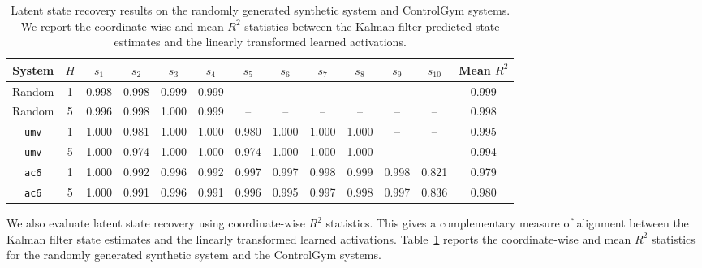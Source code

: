\documentclass[11pt]{article}
\newcommand{\<}{\langle}
\renewcommand{\>}{\rangle}
\numberwithin{equation}{section}
\begin{document}
\begin{table}[ht]
  \caption{Latent state recovery results on the randomly generated synthetic system and ControlGym systems. We report the coordinate-wise and mean \(R^2\) statistics between the Kalman filter predicted state estimates and the linearly transformed learned activations.}
  \label{table:latent-recovery-r2}
  \begin{center}
    \begin{small}
    \setlength{\tabcolsep}{4pt}
      \begin{sc}
        \begin{tabular}{ccccccccccccc}
          \toprule
          System & \(H\) & \(s_1\) & \(s_2\) & \(s_3\) & \(s_4\) & \(s_5\) & \(s_6\) & \(s_7\) & \(s_8\) & \(s_9\) & \(s_{10}\) & Mean \(R^2\) \\
          \midrule
          Random & 1 & 0.998 & 0.998 & 0.999 & 0.999 & -- & -- & -- & -- & -- & -- & 0.999 \\
          Random & 5 & 0.996 & 0.998 & 1.000 & 0.999 & -- & -- & -- & -- & -- & -- & 0.998 \\
          \midrule
          \texttt{umv} & 1
          & 1.000 & 0.981 & 1.000 & 1.000 & 0.980 & 1.000 & 1.000 & 1.000 & -- & -- & 0.995 \\
          \texttt{umv} & 5
          & 1.000 & 0.974 & 1.000 & 1.000 & 0.974 & 1.000 & 1.000 & 1.000 & -- & -- & 0.994 \\
          \midrule
          \texttt{ac6} & 1
          & 1.000 & 0.992 & 0.996 & 0.992 & 0.997 & 0.997 & 0.998 & 0.999 & 0.998 & 0.821 & 0.979 \\
          \texttt{ac6} & 5
          & 1.000 & 0.991 & 0.996 & 0.991 & 0.996 & 0.995 & 0.997 & 0.998 & 0.997 & 0.836 & 0.980 \\
          \bottomrule
        \end{tabular}
      \end{sc}
    \end{small}
  \end{center}
  \vskip -0.1in
\end{table}

We also evaluate latent state recovery using coordinate-wise \(R^2\) statistics. This gives a complementary measure of alignment between the Kalman filter state estimates and the linearly transformed learned activations. Table~\ref{table:latent-recovery-r2} reports the coordinate-wise and mean \(R^2\) statistics for the randomly generated synthetic system and the ControlGym systems.
\end{document}
